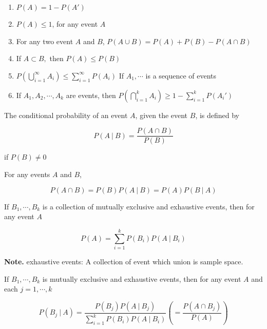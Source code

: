 
\begin{thm*}$ $
	\begin{enumerate}[wide,label = $\bullet$]
		\item $P(A) = 1 - P(A')$
		\item $P(A) \leq 1$, for any event $A$
		\item For any two event $A$ and $B$, $P(A \cup B) = P(A) + P(B) - P(A \cap B)$
		\item If $A \subset B,$ then $P(A) \leq P(B)$
		\item $P\left( \bigcup^{\infty}_{i = 1} A_i \right) \leq \sum^{\infty}_{i = 1}P(A_i)$ If $A_1,\cdots$ is a sequence of events
		\item If $A_1,A_2,\cdots,A_k$ are events, then $P(\bigcap_{i=1}^{k}A_i) \geq 1 - \sum_{i=1}^kP(A_i')$ 
	\end{enumerate}
\end{thm*}

\newpage

\begin{defn}
	The conditional probability of an event $A$, given the event $B$, is defined by 
	
	$$P(A~|~B) = \frac{P(A \cap B)}{P(B)}$$
	
	if $P(B) \neq 0$
\end{defn}

\begin{thm*}
	For any events $A$ and $B$,
	
	$$P(A \cap B) = P(B)P(A~|~B) = P(A)P(B~|~A)$$
\end{thm*}

\begin{thm*}
	If $B_1,\cdots,B_k$ is a collection of mutually exclusive and exhaustive events, then for any event $A$
	
	$$P(A) = \sum^{k}_{i = 1}P(B_i)P(A~|~B_i)$$
\end{thm*}

\textbf{Note.} exhaustive events:  A collection of event which union is sample space.

\begin{thm*}
	If $B_1,\cdots,B_k$ is mutually exclusive and exhaustive events, then for any event $A$ and each $j = 1,\cdots,k$
	
	$$P(B_j ~|~ A) = \dfrac{P(B_j)P(A~|~B_j)}{\sum^{k}_{i=1}P(B_i)P(A~|~B_i)} \left(  = \dfrac{P(A \cap B_j)}{P(A)}\right)$$
\end{thm*}

